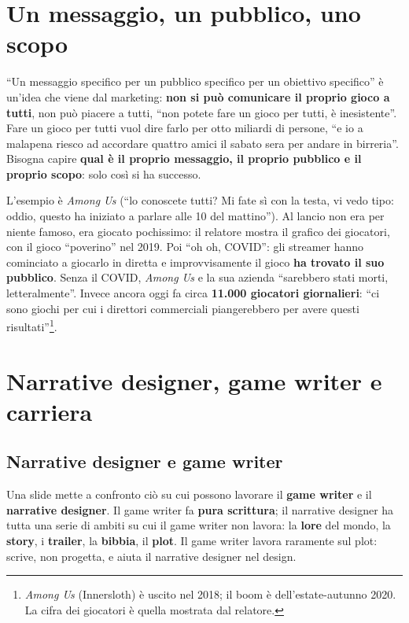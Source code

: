 \section{Un messaggio, un pubblico, uno scopo}
\label{p3:sec:pubblico}

``Un messaggio specifico per un pubblico specifico per un obiettivo
specifico'' è un'idea che viene dal marketing: \textbf{non si può comunicare
il proprio gioco a tutti}, non può piacere a tutti, ``non potete fare un
gioco per tutti, è inesistente''. Fare un gioco per tutti vuol dire farlo per
otto miliardi di persone, ``e io a malapena riesco ad accordare quattro amici
il sabato sera per andare in birreria''. Bisogna capire \textbf{qual è il
proprio messaggio, il proprio pubblico e il proprio scopo}: solo così si ha
successo.

L'esempio è \emph{Among Us} (``lo conoscete tutti? Mi fate sì con la testa,
vi vedo tipo: oddio, questo ha iniziato a parlare alle 10 del mattino''). Al
lancio non era per niente famoso, era giocato pochissimo: il relatore mostra
il grafico dei giocatori, con il gioco ``poverino'' nel 2019. Poi ``oh oh,
COVID'': gli streamer hanno cominciato a giocarlo in diretta e
improvvisamente il gioco \textbf{ha trovato il suo pubblico}. Senza il COVID,
\emph{Among Us} e la sua azienda ``sarebbero stati morti, letteralmente''.
Invece ancora oggi fa circa \textbf{11.000 giocatori giornalieri}: ``ci sono
giochi per cui i direttori commerciali piangerebbero per avere questi
risultati''\footnote{\emph{Among Us} (Innersloth) è uscito nel 2018; il boom
è dell'estate-autunno 2020. La cifra dei giocatori è quella mostrata dal
relatore.}.

\section{Narrative designer, game writer e carriera}
\label{p3:sec:carriera}

\subsection{Narrative designer e game writer}

Una slide mette a confronto ciò su cui possono lavorare il \textbf{game
writer} e il \textbf{narrative designer}. Il game writer fa \textbf{pura
scrittura}; il narrative designer ha tutta una serie di ambiti su cui il game
writer non lavora: la \textbf{lore} del mondo, la \textbf{story}, i
\textbf{trailer}, la \textbf{bibbia}, il \textbf{plot}. Il game writer
lavora raramente sul plot: scrive, non progetta, e aiuta il narrative
designer nel design.

